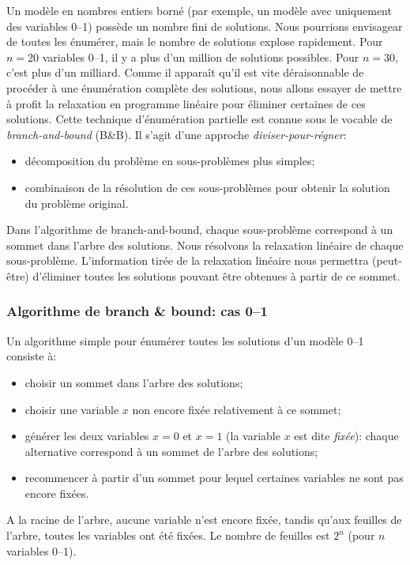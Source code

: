 Un modèle en nombres entiers borné (par exemple, un modèle avec uniquement des variables 0--1) possède un nombre fini de solutions.
Nous pourrions envisagear de toutes les énumérer, mais le nombre de solutions explose rapidement. Pour $n = 20$ variables 0--1, il y a plus d'un million de solutions possibles.
Pour $n=30$, c'est plus d'un milliard.
Comme il apparaît qu'il est vite déraisonnable de procéder à une énumération complète des solutions, nous allons essayer de mettre à profit la relaxation en programme linéaire pour éliminer certaines de ces solutions.
Cette technique d'énumération partielle est connue sous le vocable de {\sl branch-and-bound} (B\&B).
Il s'agit d'une approche {\sl diviser-pour-régner}:
\begin{itemize}
\item
décomposition du problème en sous-problèmes plus simples;
\item
combinaison de la résolution de ces sous-problèmes pour obtenir la solution du problème original.
\end{itemize}
Dans l'algorithme de branch-and-bound, chaque sous-problème correspond à un sommet dans l'arbre des solutions.
Nous résolvons la relaxation linéaire de chaque sous-problème.
L'information tirée de la relaxation linéaire nous permettra (peut-être) d'éliminer toutes les solutions pouvant être obtenues à partir de ce sommet.

\subsubsection{Algorithme de branch \& bound: cas 0--1}

Un algorithme simple pour énumérer toutes les solutions d'un modèle 0--1 consiste à:
\begin{itemize}
\item
choisir un sommet dans l'arbre des solutions;
\item
choisir une variable $x$ non encore fixée relativement à ce sommet;
\item
générer les deux variables $x = 0$ et $x = 1$ (la variable $x$ est dite {\sl fixée}): chaque alternative correspond à un sommet de l'arbre des solutions;
\item
recommencer à partir d'un sommet pour lequel certaines variables ne sont pas encore fixées.
\end{itemize}
A la racine de l'arbre, aucune variable n'est encore fixée, tandis qu'aux feuilles de l'arbre, toutes les variables ont été fixées.
Le nombre de feuilles est $2^n$ (pour $n$ variables 0--1).

